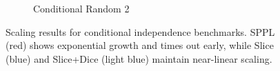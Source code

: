 \begin{figure}[!t]
\begin{subfigure}{0.32\textwidth}
\caption{Conditional Random 2}
\label{fig:cond-benchmarks-c}
\end{subfigure}
\caption{Scaling results for conditional independence benchmarks. SPPL (red) shows exponential growth and times out early, while Slice (blue) and Slice+Dice (light blue) maintain near-linear scaling.}
\label{fig:cond-benchmarks}
\end{figure}